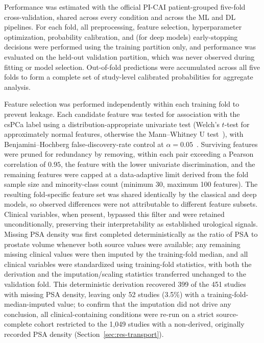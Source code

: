 \documentclass[11pt]{article}
\begin{document}
Performance was estimated with the official PI-CAI patient-grouped five-fold
cross-validation, shared across every condition and across the ML and DL
pipelines. For each fold, all preprocessing, feature selection, hyperparameter
optimization, probability calibration, and (for deep models) early-stopping
decisions were performed using the training partition only, and performance was
evaluated on the held-out validation partition, which was never observed during
fitting or model selection. Out-of-fold predictions were accumulated across all
five folds to form a complete set of study-level calibrated probabilities for
aggregate analysis.

Feature selection was performed independently within each training fold to
prevent leakage. Each candidate feature was tested for association with the
csPCa label using a distribution-appropriate univariate test (Welch's $t$-test
for approximately normal features, otherwise the Mann--Whitney U
test~\citep{mann1947test}), with Benjamini--Hochberg false-discovery-rate
control at $\alpha = 0.05$~\citep{benjamini1995controlling}. Surviving features
were pruned for redundancy by removing, within each pair exceeding a Pearson
correlation of $0.95$, the feature with the lower univariate discrimination, and
the remaining features were capped at a data-adaptive limit derived from the
fold sample size and minority-class count (minimum 30, maximum 100 features).
The resulting fold-specific feature set was shared identically by the classical
and deep models, so observed differences were not attributable to different
feature subsets. Clinical variables, when present, bypassed this
filter and were retained unconditionally, preserving their interpretability as
established urological signals. Missing PSA density was first completed
deterministically as the ratio of PSA to prostate volume whenever both source
values were available; any remaining missing clinical values were then imputed by
the training-fold median, and all clinical variables were standardized using
training-fold statistics, with both the derivation and the imputation/scaling
statistics transferred unchanged to the validation fold. This deterministic
derivation recovered 399 of the 451 studies with missing PSA density, leaving only
52 studies (3.5\%) with a training-fold-median-imputed value; to confirm that the
imputation did not drive any conclusion, all clinical-containing conditions were
re-run on a strict source-complete cohort restricted to the 1{,}049 studies with a
non-derived, originally recorded PSA density (Section~\ref{sec:res-transport}).
\end{document}
